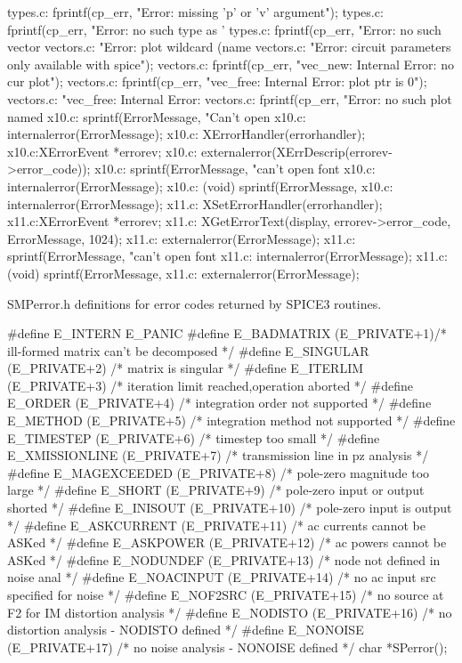 {{{{{{types.c:        fprintf(cp_err, "Error: missing 'p' or 'v' argument\n");
types.c:        fprintf(cp_err, "Error: no such type as '%
types.c:            fprintf(cp_err, "Error: no such vector %
vectors.c:            "Error: plot wildcard (name %
vectors.c:        "Error: circuit parameters only available with spice\n");
vectors.c:        fprintf(cp_err, "vec_new: Internal Error: no cur plot\n");
vectors.c:        fprintf(cp_err, "vec_free: Internal Error: plot ptr is 0\n");
vectors.c:                "vec_free: Internal Error: %
vectors.c:        fprintf(cp_err, "Error: no such plot named %
x10.c:      sprintf(ErrorMessage, "Can't open %
x10.c:      internalerror(ErrorMessage);
x10.c:    XErrorHandler(errorhandler);
x10.c:XErrorEvent *errorev;
x10.c:    externalerror(XErrDescrip(errorev->error_code));
x10.c:      sprintf(ErrorMessage, "can't open font %
x10.c:      internalerror(ErrorMessage);
x10.c:        (void) sprintf(ErrorMessage,
x10.c:        internalerror(ErrorMessage);
x11.c:	XSetErrorHandler(errorhandler);
x11.c:XErrorEvent *errorev;
x11.c:	XGetErrorText(display, errorev->error_code, ErrorMessage, 1024);
x11.c:	externalerror(ErrorMessage);
x11.c:	  sprintf(ErrorMessage, "can't open font %
x11.c:	  internalerror(ErrorMessage);
x11.c:	    (void) sprintf(ErrorMessage,
x11.c:	    externalerror(ErrorMessage);



SMPerror.h
definitions for error codes returned by SPICE3 routines.

#define E_INTERN E_PANIC
#define E_BADMATRIX (E_PRIVATE+1)/* ill-formed matrix can't be decomposed */
#define E_SINGULAR (E_PRIVATE+2) /* matrix is singular */
#define E_ITERLIM (E_PRIVATE+3)  /* iteration limit reached,operation aborted */
#define E_ORDER (E_PRIVATE+4)    /* integration order not supported */
#define E_METHOD (E_PRIVATE+5)   /* integration method not supported */
#define E_TIMESTEP (E_PRIVATE+6) /* timestep too small */
#define E_XMISSIONLINE (E_PRIVATE+7)    /* transmission line in pz analysis */
#define E_MAGEXCEEDED (E_PRIVATE+8) /* pole-zero magnitude too large */
#define E_SHORT (E_PRIVATE+9)   /* pole-zero input or output shorted */
#define E_INISOUT (E_PRIVATE+10)    /* pole-zero input is output */
#define E_ASKCURRENT (E_PRIVATE+11) /* ac currents cannot be ASKed */
#define E_ASKPOWER (E_PRIVATE+12)   /* ac powers cannot be ASKed */
#define E_NODUNDEF (E_PRIVATE+13) /* node not defined in noise anal */
#define E_NOACINPUT (E_PRIVATE+14) /* no ac input src specified for noise */
#define E_NOF2SRC (E_PRIVATE+15) /* no source at F2 for IM distortion analysis */
#define E_NODISTO (E_PRIVATE+16) /* no distortion analysis - NODISTO defined */
#define E_NONOISE (E_PRIVATE+17) /* no noise analysis - NONOISE defined */
char *SPerror();





}}}}}}
